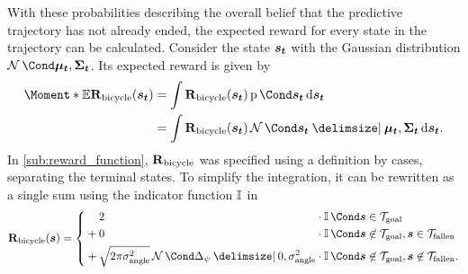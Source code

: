 With these probabilities describing the overall belief that the predictive trajectory has not already ended, the expected reward for every state in the trajectory can be calculated.
Consider the state $\bm{s_t}$ with the Gaussian distribution $\Gaussian{\mat{\mu_t}, \mat{\Sigma_t}}$.
Its expected reward is given by
\begin{align}
    \begin{split}
        \Moment*{\E}{\RwdBicycle(\rv{s_t})} &= \int \RwdBicycle(\rv{s_t}) \Prob{\rv{s_t}} \diff \rv{s_t} \\
        &= \int \RwdBicycle(\rv{s_t}) \Gaussian{\rv{s_t} \given \mat{\mu_t}, \mat{\Sigma_t}} \diff \rv{s_t}.
    \end{split}
\end{align}
In \cref{sub:reward_function}, $\operatorname{\operatorname{\mathbf{R}}_{\text{bicycle}}}$ was specified using a definition by cases, separating the terminal states.
To simplify the integration, it can be rewritten as a single sum using the indicator function $\operatorname{\mathbb{I}}$ in
\begin{align}
    \RwdBicycle(\mat{s}) = \left\{ \begin{alignedat}{3}
            &&& 2 &&\cdot \Indicator{\rv{s} \in \Goal} \\
            &&{}+{}& 0 &&\cdot \Indicator{\rv{s} \not\in\Goal, \rv{s} \in \Fallen} \\
            &&{}+{}& \sqrt{2\pi\sigma_{\text{angle}}^2}\Gaussian{\Delta_\psi \given 0, \sigma_{\text{angle}}^2} &&\cdot \Indicator{\rv{s} \not\in\Goal, \rv{s} \not\in\Fallen}.
        \end{alignedat}\right.
\end{align}

